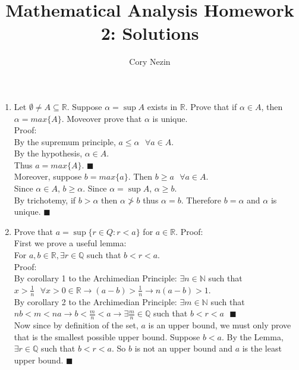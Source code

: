 \documentclass[12pt]{article}
\title{Mathematical Analysis Homework 2: Solutions}
\author{Cory Nezin}
\begin{document}
\maketitle
\begin{enumerate}
\item Let $\emptyset \neq A \subseteq \mathbb{R}$.
Suppose $\alpha = \sup A$ exists in $\mathbb{R}$.  Prove that if $\alpha \in A$, then $\alpha = max\{A\}$.  Moveover prove that $\alpha$ is unique.\\

Proof:\\
By the supremum principle,
$ a \leq \alpha \text{ } \forall a\in A $.\\
By the hypothesis, $ \alpha \in A$.\\
Thus $a = max\{A\}$.  $\blacksquare$\\
Moreover, suppose $b = max\{a\}$.  Then $b \geq a \text{ } \forall a\in A$.\\
Since $\alpha \in A$, $b \geq \alpha$.  Since $\alpha = \sup A$, $\alpha \geq b$.\\
By trichotemy, if $b > \alpha$ then $\alpha \ngtr b$ thus $\alpha=b$.  Therefore $b=\alpha$ and $\alpha$ is unique.  $\blacksquare$
\item Prove that $a = \sup\{r \in Q: r < a\}$ for $a\in\mathbb{R}$.
Proof:\\
First we prove a useful lemma:\\
For $a,b \in \mathbb{R}, \exists r\in\mathbb{Q}$ such that $b<r<a$.\\
Proof:\\
By corollary 1 to the Archimedian Principle: $\exists n\in \mathbb{N}$ such that $x > \frac{1}{n} \text{ }\forall x>0 \in \mathbb{R} \rightarrow (a-b) > \frac{1}{n} \rightarrow n(a-b) > 1$.\\
By corollary 2 to the Archimedian Principle: $\exists m \in \mathbb{N}$ such that $nb < m < na \rightarrow b < \frac{m}{n} < a \rightarrow \exists \frac{m}{n} \in \mathbb{Q}$ such that $b < r < a \text{ }\blacksquare$\\

Now since by definition of the set, $a$ is an upper bound, we must only prove that is the smallest possible upper bound.  Suppose $b<a$.  By the Lemma, $\exists r\in\mathbb{Q}$ such that $b<r<a$.  So $b$ is not an upper bound and $a$ is the least upper bound.  $\blacksquare$
\end{enumerate}
\end{document}
